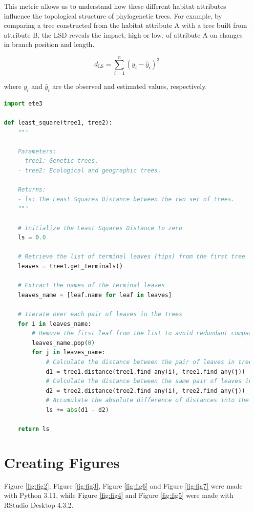 This metric allows us to understand how these different habitat attributes influence the topological structure of phylogenetic trees. For example, by comparing a tree constructed from the habitat attribute A with a tree built from attribute B, the LSD reveals the impact, high or low, of attribute A on changes in branch position and length.

\begin{equation}\label{eq:ls}
    d_{\text{LS}} = \sum_{i=1}^{n} (y_i - \hat{y}_i)^2
\end{equation}

where $y_i$ and $\hat{y}_i$ are the observed and estimated values, respectively.

\begin{lstlisting}[label=lst:LeastSquare, language=Python, caption=Python script for calculating the LSD using the ete3 package in the aPhyloGeo package]
import ete3

def least_square(tree1, tree2):
    """
    
    Parameters:
    - tree1: Genetic trees.
    - tree2: Ecological and geographic trees.

    Returns:
    - ls: The Least Squares Distance between the two set of trees.
    """
    
    # Initialize the Least Squares Distance to zero
    ls = 0.0
    
    # Retrieve the list of terminal leaves (tips) from the first tree
    leaves = tree1.get_terminals()
    
    # Extract the names of the terminal leaves
    leaves_name = [leaf.name for leaf in leaves]
    
    # Iterate over each pair of leaves in the trees
    for i in leaves_name:
        # Remove the first leaf from the list to avoid redundant comparisons
        leaves_name.pop(0)
        for j in leaves_name:
            # Calculate the distance between the pair of leaves in tree1
            d1 = tree1.distance(tree1.find_any(i), tree1.find_any(j))
            # Calculate the distance between the same pair of leaves in tree2
            d2 = tree2.distance(tree2.find_any(i), tree2.find_any(j))
            # Accumulate the absolute difference of distances into the LSD
            ls += abs(d1 - d2)
    
    return ls
\end{lstlisting}

\section{Creating Figures}\label{Figures}
Figure \ref{fig:fig2}, Figure \ref{fig:fig3}, Figure \ref{fig:fig6} and Figure \ref{fig:fig7} were made with Python 3.11, while Figure \ref{fig:fig4} and Figure \ref{fig:fig5} were made with RStudio Desktop 4.3.2.

